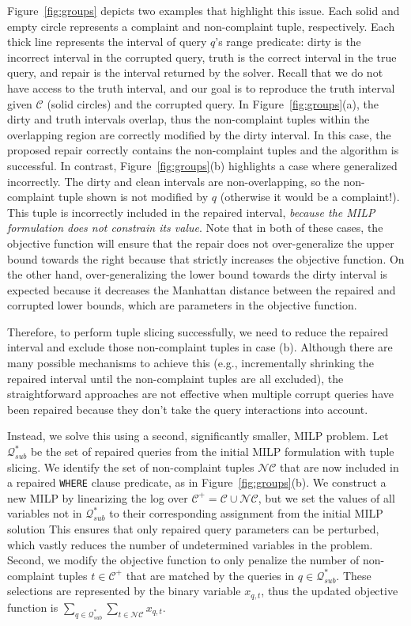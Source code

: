 Figure~\ref{fig:groups} depicts two examples that highlight this issue.
Each solid and empty circle represents a complaint and non-complaint tuple, respectively.
Each thick line represents the interval of query $q$'s range predicate: 
dirty is the incorrect interval in the corrupted query,
truth is the correct interval in the true query, 
and repair is the interval returned by the solver.
Recall that we do not have access to the truth interval, and our goal is to reproduce the 
truth interval given $\mathcal{C}$ (solid circles) and the corrupted query.
% 
In Figure~\ref{fig:groups}(a), the dirty and truth intervals overlap, thus the non-complaint tuples 
within the overlapping region are correctly modified by the dirty interval.  
In this case, the proposed repair correctly contains the non-complaint tuples and the algorithm is successful.
In contrast, Figure~\ref{fig:groups}(b) highlights a case where \sys generalized incorrectly.
The dirty and clean intervals are non-overlapping, so the non-complaint tuple shown is not modified by $q$ (otherwise it would be a complaint!). This tuple is incorrectly included in the repaired interval, \emph{because the MILP formulation does not constrain its value}.
Note that in both of these cases, the objective function will ensure that the repair
does not over-generalize the upper bound towards the right because that strictly increases the objective function.
On the other hand, over-generalizing the lower bound towards the dirty interval
is expected because it decreases the Manhattan distance between the repaired and corrupted lower bounds,
which are parameters in the objective function.

Therefore, to perform tuple slicing successfully, we need to reduce the repaired interval and exclude those non-complaint tuples in case (b).  
Although there are many possible mechanisms to achieve this (e.g., incrementally shrinking
the repaired interval until the non-complaint tuples are all excluded), 
the straightforward approaches are not effective when multiple corrupt 
queries have been repaired because they don't take the query interactions into account.

Instead, we solve this using a second, significantly smaller, MILP problem.   
Let $\mathcal{Q}^*_{sub}$ be the set of repaired queries from the  initial MILP formulation with tuple slicing.
We identify the set of non-complaint tuples $\mathcal{NC}$ that are now included in a repaired \texttt{WHERE} clause predicate, as in Figure~\ref{fig:groups}(b). We construct a new MILP by linearizing the log over $\mathcal{C}^+ = \mathcal{C} \cup \mathcal{NC}$, but we set the values of all variables not in $\mathcal{Q}^*_{sub}$ to their corresponding assignment from the initial MILP solution
This ensures that only repaired query parameters can
be perturbed, which vastly reduces the number of undetermined variables in the problem.
Second, we modify the objective function to only penalize the number of non-complaint tuples 
$t \in \mathcal{C}^+$ that are matched by the queries in $q \in \mathcal{Q}^*_{sub}$.
These selections are represented by the binary variable $x_{q, t}$, thus the updated objective function
is $\sum_{q \in \mathcal{Q}^*_{sub}} \sum_{t \in \mathcal{NC}} x_{q,t}$.


